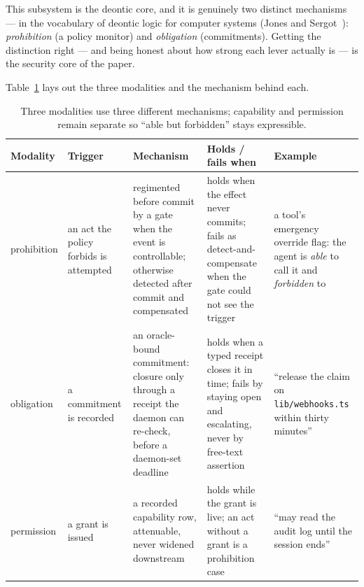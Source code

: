 \documentclass[11pt,a4paper]{article}
\theoremstyle{definition}
\theoremstyle{remark}
\begin{document}
This subsystem is the deontic core, and it is genuinely two distinct mechanisms ---
in the vocabulary of deontic logic for computer systems (Jones and
Sergot~): \emph{prohibition} (a policy monitor) and
\emph{obligation} (commitments). Getting the distinction right --- and being honest
about how strong each lever actually is --- is the security core of the paper.

Table~\ref{tab:swk-deontic-split} lays out the three modalities and the mechanism
behind each.

\begin{table}[H]
\centering
\caption{Three modalities use three different mechanisms; capability and
permission remain separate so ``able but forbidden'' stays expressible.}
\label{tab:swk-deontic-split}
\small
\renewcommand{\arraystretch}{1.18}
\begin{tabularx}{\textwidth}{@{}>{\raggedright\arraybackslash}p{} >{\raggedright\arraybackslash}p{} >{\raggedright\arraybackslash}X >{\raggedright\arraybackslash}X >{\raggedright\arraybackslash}p{}@{}}
\toprule
\textbf{Modality} & \textbf{Trigger} & \textbf{Mechanism} & \textbf{Holds / fails when} & \textbf{Example} \\
\midrule
prohibition & an act the policy forbids is attempted & regimented before commit by a gate when the event is controllable; otherwise detected after commit and compensated & holds when the effect never commits; fails as detect-and-compensate when the gate could not see the trigger & a tool's emergency override flag: the agent is \emph{able} to call it and \emph{forbidden} to \\
obligation & a commitment is recorded & an oracle-bound commitment: closure only through a receipt the daemon can re-check, before a daemon-set deadline & holds when a typed receipt closes it in time; fails by staying open and escalating, never by free-text assertion & ``release the claim on \texttt{lib/\allowbreak webhooks.ts} within thirty minutes'' \\
permission & a grant is issued & a recorded capability row, attenuable, never widened downstream & holds while the grant is live; an act without a grant is a prohibition case & ``may read the audit log until the session ends'' \\
\bottomrule
\end{tabularx}
\end{table}
\end{document}
